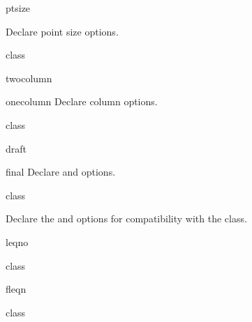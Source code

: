 \documentclass{skdoc}
\begin{document}
	\begin{option}{ptsize}
	\begin{option}{10pt}
	\begin{option}{11pt}
	\begin{option}{12pt}
	Declare point size options.
\begin{MacroCode}{class}
\DeclareVoidOption{10pt}{\skrapport@SetupPtsize}
\DeclareVoidOption{11pt}{\skrapport@SetupPtsize}
\DeclareVoidOption{12pt}{\skrapport@SetupPtsize}
\newcommand*{\skrapport@SetupPtsize}{\expandafter\@skrapport@SetupPtsize\expandafter{\CurrentOption}}
\newcommand*{\@skrapport@SetupPtsize}[1]{\setkeys{skrapport}{ptsize={#1}}}
\end{MacroCode}
	\end{option}
	\end{option}
	\end{option}
	\end{option}

	\begin{option}{twocolumn}
	\begin{option}{onecolumn}
	Declare column options.
\begin{MacroCode}{class}
\end{MacroCode}
	\end{option}
	\end{option}

	\begin{option}{draft}
	\begin{option}{final}
	Declare  and  options.
\begin{MacroCode}{class}
\end{MacroCode}
	\end{option}
	\end{option}


	Declare the  and  options for
	compatibility with the  class.
	\begin{option}{leqno}
\begin{MacroCode}{class}
\end{MacroCode}
	\end{option}
	\begin{option}{fleqn}
\begin{MacroCode}{class}
\end{MacroCode}
	\end{option}
\end{document}
